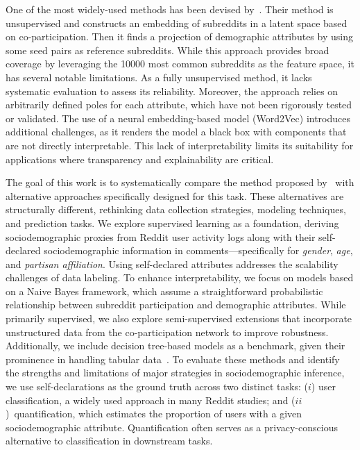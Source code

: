 One of the most widely-used methods has been devised by~\citet{waller2021quantifying}.
Their method is unsupervised and constructs an embedding of subreddits in a latent space based on co-participation.
Then it finds a projection of demographic attributes by using some seed pairs as reference subreddits.
While this approach provides broad coverage by leveraging the \num{10000} most common subreddits as the feature space, it has several notable limitations.
As a fully unsupervised method, it lacks systematic evaluation to assess its reliability.
Moreover, the approach relies on arbitrarily defined poles for each attribute, which have not been rigorously tested or validated.
The use of a neural embedding-based model (Word2Vec) introduces additional challenges, as it renders the model a black box with components that are not directly interpretable.
This lack of interpretability limits its suitability for applications where transparency and explainability are critical.




\smallskip
The goal of this work is to systematically compare the method proposed by~\citet{waller2021quantifying} with alternative approaches specifically designed for this task. These alternatives are structurally different, rethinking data collection strategies, modeling techniques, and prediction tasks.
We explore supervised learning as a foundation, deriving sociodemographic proxies from Reddit user activity logs along with their self-declared sociodemographic information in comments—specifically for \emph{gender}, \emph{age}, and \emph{partisan affiliation}. 
Using self-declared attributes addresses the scalability challenges of data labeling.
To enhance interpretability, we focus on models based on a Naive Bayes framework, which assume a straightforward probabilistic relationship between subreddit participation and demographic attributes. 
While primarily supervised, we also explore semi-supervised extensions that incorporate unstructured data from the co-participation network to improve robustness. 
Additionally, we include decision tree-based models as a benchmark, given their prominence in handling tabular data~\citep{grinsztajn2022why}. %
To evaluate these methods and identify the strengths and limitations of major strategies in sociodemographic inference, we use self-declarations as the ground truth across two distinct tasks:
($i$) user classification, a widely used approach in many Reddit studies;
and ($ii$)~quantification, which estimates the proportion of users with a given sociodemographic attribute. 
Quantification often serves as a privacy-conscious alternative to classification in downstream tasks.

